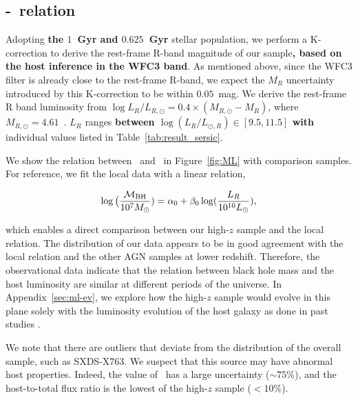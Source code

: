 \documentclass[apj]{emulateapj}
\begin{document}
 
\subsection{\mbh-\lhost\ relation}\label{sec:ml}

Adopting {\bf the $1$~Gyr and $0.625$~Gyr} stellar population, we perform a K-correction to derive the rest-frame R-band magnitude of our sample{\bf, based on the host inference in the  WFC3 band}. As mentioned above, since the WFC3 filter is already close to the rest-frame R-band, we expect the $M_R$ uncertainty introduced by this K-correction to be within $0.05$~mag. We derive the rest-frame R band luminosity from $\log L_R/L_{R, \odot} = 0.4\times(M_{R, \odot}-M_R)$, where $M_{R, \odot}=4.61$~\citep{Blanton07}. $L_R$ ranges {\bf between $\log (L_R/L_{\odot,R})  \in [9.5, 11.5]$ with} individual values listed in Table~\ref{tab:result_sersic}. 

We show the relation between \mbh\ and \lhost\ in Figure~\ref{fig:ML} with comparison samples. For reference, we fit the local data with a linear relation,

\begin{eqnarray}
\label{eq:MLlocal}
\log \big( \frac{\mathcal M_{\rm BH}}{10^{7}M_{\odot}})= \alpha_0 + \beta_0 \log(\frac{L_R}{10^{10}L_{\odot}}),
\end {eqnarray}

\noindent which enables a direct comparison between our high-$z$ sample and the local relation. The distribution of our data appears to be in good agreement with the local relation and the other AGN samples at lower redshift. Therefore, the observational data indicate that the relation between black hole mass and the host luminosity are similar at different periods of the universe. In Appendix~\ref{sec:ml-ev}, we explore how the high-$z$  sample would evolve in this plane solely with the luminosity evolution of the host galaxy as done in past studies \citep[e.g., ][]{Ding2017b}. 

We note that there are outliers that deviate from the distribution of the overall sample, such as SXDS-X763. We suspect that this source may have abnormal host properties. Indeed, the value of \Reff\ has a large uncertainty ($\sim 75\%$), and the host-to-total flux ratio is the lowest of the high-$z$ sample ($<10\%$). 
\end{document}

